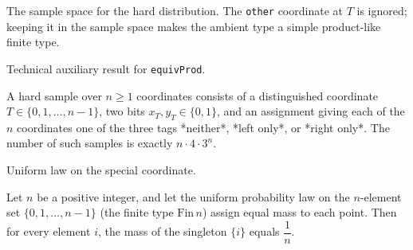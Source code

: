\begin{definition}[Hardsample]
\label{CommunicationComplexity.Functions.Disjointness.RandomizedLowerBound.HardSample}
\leanok
The sample space for the hard distribution.  The \texttt{other} coordinate at $T$ is ignored; keeping it in the sample space makes the ambient type a simple product-like finite type.
\end{definition}

\begin{definition}[Equivprod]
\label{CommunicationComplexity.Functions.Disjointness.RandomizedLowerBound.HardSample.equivProd}
\leanok
{}
Technical auxiliary result for \texttt{equivProd}.
\end{definition}

\begin{theorem}
\label{CommunicationComplexity.Functions.Disjointness.RandomizedLowerBound.HardSample.card}
\leanok
{}
A hard sample over $n \ge 1$ coordinates consists of a distinguished coordinate $T \in
\{0,1,\dots,n-1\}$, two bits $x_T, y_T \in \{0,1\}$, and an assignment giving each of
the $n$ coordinates one of the three tags *neither*, *left only*, or *right only*. The
number of such samples is exactly $n \cdot 4 \cdot 3^{n}$.
\end{theorem}

\begin{definition}[Uniformfin]
\label{CommunicationComplexity.Functions.Disjointness.RandomizedLowerBound.uniformFin}
\leanok
Uniform law on the special coordinate.
\end{definition}

\begin{theorem}
\label{CommunicationComplexity.Functions.Disjointness.RandomizedLowerBound.uniformFin_singleton}
\leanok
{}
Let $n$ be a positive integer, and let the uniform probability law on the $n$-element
set $\{0,1,\dots,n-1\}$ (the finite type $\mathrm{Fin}\,n$) assign equal mass to each
point. Then for every element $i$, the mass of the singleton $\{i\}$ equals
$\dfrac{1}{n}$.
\end{theorem}

